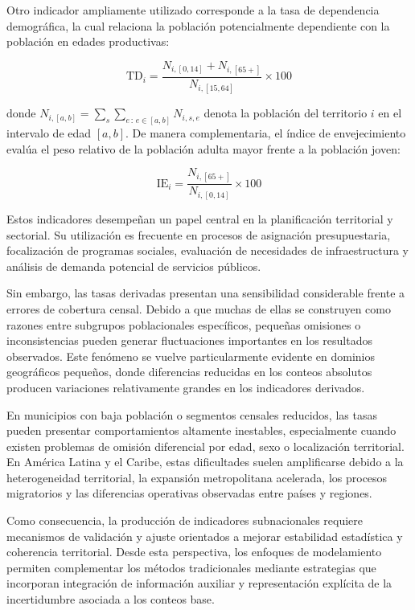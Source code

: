 \documentclass[
  spanish,
]{book}
\begin{document}
Otro indicador ampliamente utilizado corresponde a la tasa de dependencia demográfica, la cual relaciona la población potencialmente dependiente con la población en edades productivas:

\[
\text{TD}_i = \frac{N_{i,[0,14]} + N_{i,[65+]}}{N_{i,[15,64]}} \times 100
\]

donde \(N_{i,[a,b]} = \sum_{s} \sum_{e \,:\, e \in [a,b]} N_{i,s,e}\) denota la población del territorio \(i\) en el intervalo de edad \([a, b]\). De manera complementaria, el índice de envejecimiento evalúa el peso relativo de la población adulta mayor frente a la población joven:

\[
\text{IE}_i = \frac{N_{i,[65+]}}{N_{i,[0,14]}} \times 100
\]

Estos indicadores desempeñan un papel central en la planificación territorial y sectorial. Su utilización es frecuente en procesos de asignación presupuestaria, focalización de programas sociales, evaluación de necesidades de infraestructura y análisis de demanda potencial de servicios públicos.

Sin embargo, las tasas derivadas presentan una sensibilidad considerable frente a errores de cobertura censal. Debido a que muchas de ellas se construyen como razones entre subgrupos poblacionales específicos, pequeñas omisiones o inconsistencias pueden generar fluctuaciones importantes en los resultados observados. Este fenómeno se vuelve particularmente evidente en dominios geográficos pequeños, donde diferencias reducidas en los conteos absolutos producen variaciones relativamente grandes en los indicadores derivados.

En municipios con baja población o segmentos censales reducidos, las tasas pueden presentar comportamientos altamente inestables, especialmente cuando existen problemas de omisión diferencial por edad, sexo o localización territorial. En América Latina y el Caribe, estas dificultades suelen amplificarse debido a la heterogeneidad territorial, la expansión metropolitana acelerada, los procesos migratorios y las diferencias operativas observadas entre países y regiones.

Como consecuencia, la producción de indicadores subnacionales requiere mecanismos de validación y ajuste orientados a mejorar estabilidad estadística y coherencia territorial. Desde esta perspectiva, los enfoques de modelamiento permiten complementar los métodos tradicionales mediante estrategias que incorporan integración de información auxiliar y representación explícita de la incertidumbre asociada a los conteos base.
\end{document}
